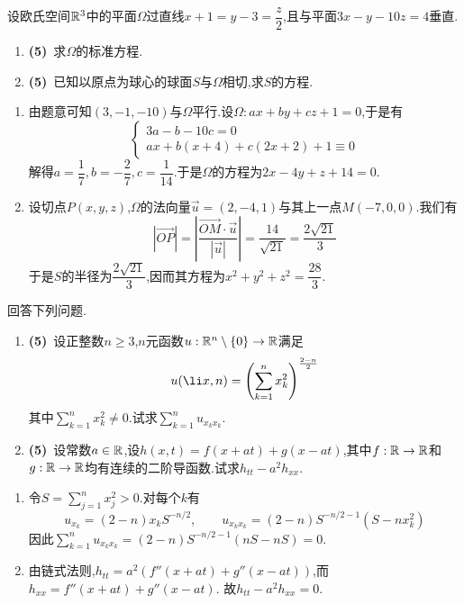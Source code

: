 \documentclass{ctexart}
\begin{document}
\begin{problem}[2.(10\songti{分})]
设欧氏空间$\mathbb{R}^3$中的平面$\Omega$过直线$x+1=y-3=\dfrac{z}2$,且与平面$3x-y-10z=4$垂直.
        \begin{enumerate}[label=\tbf{(\arabic*)}]
            \item \textbf{(5)}\ 求$\Omega$的标准方程.
            \item \textbf{(5)}\ 已知以原点为球心的球面$S$与$\Omega$相切,求$S$的方程.
        \end{enumerate}
\end{problem}
\begin{solution}
\begin{enumerate}[label=\tbf{(\arabic*)}]
        \item 由题意可知$(3,-1,-10)$与$\Omega$平行.设$\Omega:ax+by+cz+1=0$,于是有
            \[\left\{\begin{array}{l}
                3a-b-10c=0\\
                ax+b(x+4)+c(2x+2)+1\equiv0
            \end{array}\right.\]
            解得$a=\dfrac17,b=-\dfrac27,c=\dfrac1{14}$.于是$\Omega$的方程为$2x-4y+z+14=0$.
        \item 设切点$P(x,y,z)$,$\Omega$的法向量$\vec{u}=(2,-4,1)$与其上一点$M(-7,0,0)$.我们有
            \[\left|\overrightarrow{OP}\right|=\left|\dfrac{\overrightarrow{OM}\cdot\vec{u}}{|\vec{u}|}\right|=\dfrac{14}{\sqrt{21}}=\dfrac{2\sqrt{21}}{3}\]
            于是$S$的半径为$\dfrac{2\sqrt{21}}{3}$,因而其方程为$x^2+y^2+z^2=\dfrac{28}{3}$.
    \end{enumerate}
\end{solution}
\begin{problem}[3.(10\songti{分})]
回答下列问题.
        \begin{enumerate}[label=\tbf{(\arabic*)}]
            \item \textbf{(5)}\ 设正整数$n\geqslant3$,$n$元函数$u:\mathbb{R}^n\setminus\{0\}\to\mathbb{R}$满足
                \[u(\li x,n)=\left(\sum_{k=1}^nx_k^2\right)^{\frac{2-n}{2}}\]
                其中$\displaystyle\sum_{k=1}^nx_k^2\neq0$.试求$\displaystyle\sum_{k=1}^{n}u_{x_kx_k}$.
            \item \textbf{(5)}\ 设常数$a\in\mathbb{R}$,设$h(x,t)=f(x+at)+g(x-at)$,其中$f:\mathbb{R}\to\mathbb{R}$和$g:\mathbb{R}\to\mathbb{R}$均有连续的二阶导函数.试求$h_{tt}-a^2h_{xx}$.
        \end{enumerate}
\end{problem}
\begin{solution}
\begin{enumerate}[label=\tbf{(\arabic*)},leftmargin=*]
\item 令$S=\sum_{j=1}^nx_j^2>0$.对每个$k$有
\[u_{x_k}=(2-n)x_kS^{-n/2},\qquad
u_{x_kx_k}=(2-n)S^{-n/2-1}(S-nx_k^2)\]
因此$\sum_{k=1}^nu_{x_kx_k}=(2-n)S^{-n/2-1}(nS-nS)=0$.
\item 由链式法则,$h_{tt}=a^2(f''(x+at)+g''(x-at))$,而$h_{xx}=f''(x+at)+g''(x-at)$.
故$h_{tt}-a^2h_{xx}=0$.
\end{enumerate}
\end{solution}
\end{document}
